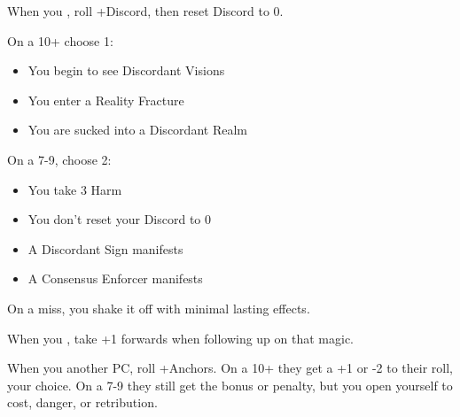 \begin{multicols}{3}
  \SEPARATOR

  \begin{move}
    When you , roll +Discord, then reset Discord to
    0.

    On a 10+ choose 1:
    \begin{itemize}
      \setlength\itemsep{0em}
    \item You begin to see Discordant Visions
    \item You enter a Reality Fracture
    \item You are sucked into a Discordant Realm
    \end{itemize}

    On a 7-9, choose 2:
    \begin{itemize}
      \setlength\itemsep{0em}
    \item You take 3 Harm
    \item You don't reset your Discord to 0
    \item A Discordant Sign manifests
    \item A Consensus Enforcer manifests
    \end{itemize}

    On a miss, you shake it off with minimal lasting effects.
  \end{move}

  \SEPARATOR

  \begin{move}
    When you , take
    +1 forwards when following up on that magic.
  \end{move}

  \SEPARATOR

  \begin{move}
    When you  another PC, roll +Anchors. On a
    10+ they get a +1 or -2 to their roll, your choice. On a 7-9 they
    still get the bonus or penalty, but you open yourself to cost,
    danger, or retribution.
  \end{move}

\end{multicols}

